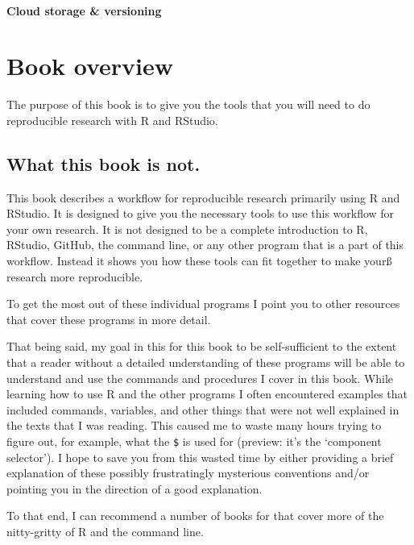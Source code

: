 \documentclass[ChapterTOCs,krantz1]{krantz}\usepackage{graphicx, color}
\begin{document}
\paragraph{Cloud storage \& versioning}

\section{Book overview}

The purpose of this book is to give you the tools that you will need to do reproducible research with R and RStudio. 

\subsection{What this book is not.}\label{WhatNot}

This book describes a workflow for reproducible research primarily using R and RStudio. It is designed to give you the necessary tools to use this workflow for your own research. It is not designed to be a complete introduction to R, RStudio, GitHub, the command line, or any other program that is a part of this workflow. Instead it shows you how these tools can fit together to make yourß research more reproducible.

To get the most out of these individual programs I point you to other resources that cover these programs in more detail.

That being said, my goal in this for this book to be self-sufficient to the extent that a reader without a detailed understanding of these programs will be able to understand and use the commands and procedures
I cover in this book. While learning how to use R and the other programs I often encountered examples that included commands, variables, and other things that were not well explained in the texts that I was reading. This caused me to waste many hours trying to figure out, for example, what the \texttt{\$} is used for (preview: it's the `component selector'). I hope to save you from this wasted time by either providing a brief explanation of
these possibly frustratingly mysterious conventions and/or pointing you in the direction of a good explanation.

To that end, I can recommend a number of books for that cover more of the nitty-gritty of R and the command line.
\end{document}
